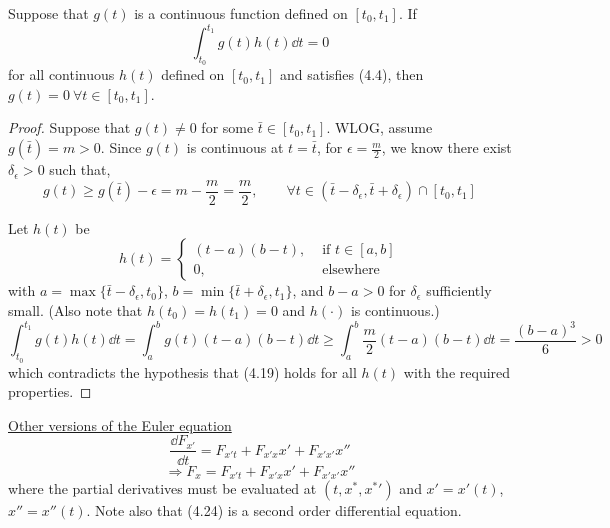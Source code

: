 \documentclass[twoside]{article}
\begin{document}
\begin{theorem}
    Suppose that $g(t)$ is a continuous function defined on $[t_0, t_1] $. If \begin{equation}
        \int_{t_0}^{t_1} g(t) h(t) \dd t = 0
    \end{equation} for all continuous $h(t)$ defined on $[t_0, t_1] $ and satisfies (4.4), then $g(t) = 0 ~ \forall t \in [t_0, t_1]$.
\end{theorem}
\begin{proof}
    Suppose that $g(t) \neq 0$ for some $\bar{t} \in [t_0, t_1]$. WLOG, assume $g(\bar{t}) = m >0$. Since $g(t)$ is continuous at $t = \bar{t}$, for $\epsilon = \frac{m}{2}$, we know there exist $\delta_\epsilon >0$ such that,
    \begin{equation}
        g(t) \geq g(\bar{t}) - \epsilon = m - \frac{m}{2} = \frac{m}{2}, \qquad \forall t \in (\bar{t}-\delta_\epsilon, \bar{t}+\delta_\epsilon)\cap [t_0, t_1]
    \end{equation}

    Let $h(t)$ be \begin{equation}
        h(t) = \begin{cases}
            (t-a)(b-t), &\text{ if } t \in [a,b]\\
            0, & \text{ elsewhere }
        \end{cases}
    \end{equation}
    with $a = \max \{\bar{t}-\delta_\epsilon, t_0 \}$, $b = \min \{ \bar{t}+\delta_\epsilon, t_1 \}$, and $b-a >0$ for $\delta_\epsilon$ sufficiently small. (Also note that $h(t_0) = h(t_1) = 0$ and $h(\cdot)$ is continuous.)
    \begin{equation}
        \int_{t_0}^{t_1} g(t) h(t) \dd t = \int_{a}^{b} g(t) (t-a)(b-t) \dd t \geq \int_{a}^{b} \frac{m}{2} (t-a)(b-t) \dd t = \frac{(b-a)^3}{6} > 0
    \end{equation}
    which contradicts the hypothesis that (4.19) holds for all $h(t)$ with the required properties.
\end{proof}

\underline{Other versions of the Euler equation}
\begin{equation}
    \frac{\dd F_{x'}}{\dd t} = F_{x't} + F_{x'x}x' + F_{x'x'} x''
\end{equation}
\begin{equation}
    \Longrightarrow F_x = F_{x't} + F_{x'x}x' + F_{x'x'} x''
\end{equation}
where the partial derivatives must be evaluated at $(t, x^*, {x^*}')$ and $x' = x'(t)$, $x'' = x''(t)$. Note also that (4.24) is a second order differential equation.
\end{document}

